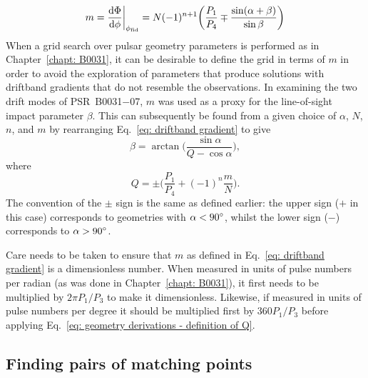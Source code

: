 \begin{equation}
    \label{eq: driftband gradient}
    m = \frac{\mathrm{d}\Phi}{\mathrm{d}\phi}\bigg|_{\phi_\mathrm{fid}} = N(-1)^{n+1} \bigg(\frac{P_1}{P_4} \mp \frac{\sin(\alpha + \beta)}{\sin\beta}\bigg)
\end{equation}
When a grid search over pulsar geometry parameters is performed as in Chapter~\ref{chapt: B0031}, it can be desirable to define the grid in terms of $m$ in order to avoid the exploration of parameters that produce solutions with driftband gradients that do not resemble the observations. In examining the two drift modes of PSR~B0031$-$07, $m$ was used as a proxy for the line-of-sight impact parameter $\beta$. This can subsequently be found from a given choice of $\alpha$, $N$, $n$, and $m$ by rearranging Eq.~\eqref{eq: driftband gradient} to give
\begin{equation}
    \label{eq: geometry derivations - beta from gradient}
    \beta = \arctan\bigg(\frac{\sin\alpha}{Q - \cos\alpha}\bigg),
\end{equation}
where 
\begin{equation}
    \label{eq: geometry derivations - definition of Q}
    Q = \pm \bigg(\frac{P_1}{P_4} + (-1)^n\frac{m}{N} \bigg).
\end{equation}
The convention of the $\pm$ sign is the same as defined earlier: the upper sign ($+$ in this case) corresponds to geometries with $\alpha < 90^\circ$, whilst the lower sign ($-$) corresponds to $\alpha > 90^\circ$.

Care needs to be taken to ensure that $m$ as defined in Eq.~\eqref{eq: driftband gradient} is a dimensionless number. When measured in units of pulse numbers per radian (as was done in Chapter~\ref{chapt: B0031}), it first needs to be multiplied by $2\pi P_1/P_3$ to make it dimensionless. Likewise, if measured in units of pulse numbers per degree it should be multiplied first by $360P_1/P_3$ before applying Eq.~\eqref{eq: geometry derivations - definition of Q}.






\subsection{Finding pairs of matching points}
\label{app: geometry derivations - P3 fold - matching points}

